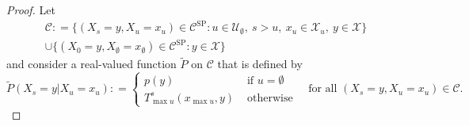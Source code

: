 \documentclass[10pt,a4paper]{paper}
\theoremstyle{definition}
\newcommand{\states}{\mathcal{X}}
\newcommand{\coloneqq}{:\!=}
\begin{document}
\theouniqueMarkovchain*
\begin{proof}
Let
\begin{multline*}
\mathcal{C}\coloneqq\{
(X_s=y,X_u=x_u)\in\mathcal{C}^{\mathrm{SP}}
\colon 
u\in\mathcal{U}_\emptyset,~s>u,~x_u\in\states_u,~y\in\states
\}\\
\cup
\{
(X_0=y,X_\emptyset=x_\emptyset)\in\mathcal{C}^{\mathrm{SP}}\colon y\in\states
\}
\end{multline*}
and consider a real-valued function $\tilde{P}$ on $\mathcal{C}$ that is defined by 
\begin{equation}\label{eq:theo:uniqueMarkovchain:prob_func}
\tilde{P}(X_s=y\vert X_u=x_u)
\coloneqq
\begin{cases}
p(y)&\text{~if $u=\emptyset$}\\
T_{\max u}^s(x_{\max u},y)&\text{~otherwise}
\end{cases}
\text{~~~for all $(X_s=y,X_u=x_u)\in\mathcal{C}$.}
\end{equation}



\end{proof}
\end{document}
